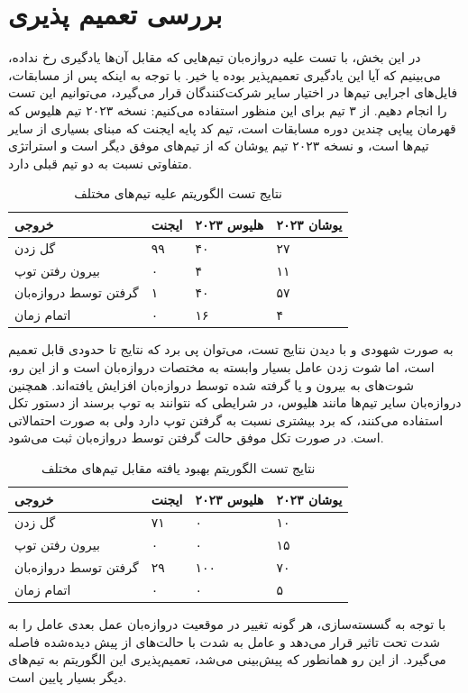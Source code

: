 \section{بررسی تعمیم پذیری}
در این بخش، با تست علیه دروازه‌بان تیم‌هایی که مقابل آن‌ها یادگیری رخ نداده، می‌بینیم که آیا این یادگیری تعمیم‌پذیر بوده یا خیر.
با توجه به اینکه پس از مسابقات، فایل‌های اجرایی تیم‌ها در اختیار سایر شرکت‌کنندگان قرار می‌گیرد، می‌توانیم این تست را انجام دهیم.
از ۳ تیم برای این منظور استفاده می‌کنیم:
نسخه ۲۰۲۳ تیم 
هلیوس
 که قهرمان پیاپی چندین دوره مسابقات است، تیم کد پایه ایجنت
 که مبنای بسیاری از سایر تیم‌ها است،
و نسخه ۲۰۲۳ تیم یوشان
 که از تیم‌های موفق دیگر است و استراتژی متفاوتی نسبت به دو تیم قبلی دارد.

\begin{table}[H]
    \centering
    \caption{نتایج تست الگوریتم  علیه تیم‌های مختلف}\label{tab:generalization}
    \begin{tabular}{ |p{4cm}|p{3cm}|p{3cm}|p{3cm}|  }
            \hline
            خروجی & ایجنت & هلیوس ۲۰۲۳ & یوشان ۲۰۲۳\\
            \hline
            گل زدن & ۹۹ & ۴۰ & ۲۷ \\
            \hline
            بیرون رفتن توپ & ۰ &۴ & ۱۱ \\
            \hline
            گرفتن توسط دروازه‌بان & ۱ &۴۰ & ۵۷ \\
            \hline
            اتمام زمان & ۰ &۱۶ & ۴ \\
            \hline
        \end{tabular}
\end{table}
به صورت شهودی و با دیدن نتایج تست، می‌توان پی برد که نتایج تا حدودی قابل تعمیم است، اما شوت زدن عامل بسیار وابسته به مختصات دروازه‌بان است و از این رو، شوت‌های به بیرون و یا گرفته شده توسط دروازه‌بان افزایش یافته‌اند.
همچنین دروازه‌بان سایر تیم‌ها مانند هلیوس،
 در شرایطی که نتوانند به توپ برسند از دستور تکل استفاده می‌کنند، که برد بیشتری نسبت به گرفتن توپ دارد ولی به صورت احتمالاتی است. در صورت تکل موفق حالت گرفتن توسط دروازه‌بان ثبت می‌شود.

\begin{table}[H]
    \centering
    \caption{نتایج تست الگوریتم  بهبود یافته مقابل تیم‌های مختلف}\label{tab:dqn_generalization}
    \begin{tabular}{ |p{4cm}|p{3cm}|p{3cm}|p{3cm}|  }
            \hline
            خروجی & ایجنت & هلیوس ۲۰۲۳ & یوشان ۲۰۲۳\\
            \hline
            گل زدن & ۷۱ & ۰ & ۱۰ \\
            \hline
            بیرون رفتن توپ & ۰ &۰ & ۱۵ \\
            \hline
            گرفتن توسط دروازه‌بان & ۲۹ &۱۰۰ & ۷۰ \\
            \hline
            اتمام زمان & ۰ &۰ & ۵ \\
            \hline
        \end{tabular}
\end{table}
با توجه به گسسته‌سازی، هر گونه تغییر در موقعیت دروازه‌بان عمل بعدی عامل را به شدت تحت تاثیر قرار می‌دهد و عامل به شدت با حالت‌های از پیش دیده‌شده فاصله می‌گیرد.
از این رو همانطور که پیش‌بینی می‌شد، تعمیم‌پذیری این الگوریتم به تیم‌های دیگر بسیار پایین است.

